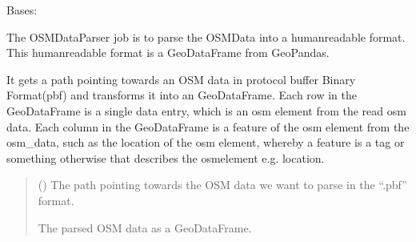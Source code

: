 \documentclass[letterpaper,10pt,english]{sphinxmanual}
\begin{document}
\begin{fulllineitems}
\label{\detokenize{apidoc/src.osm_configurator.model.parser:src.osm_configurator.model.parser.osm_data_parser_interface.OSMDataParserInterface}}
\pysigstartsignatures
{}
\pysigstopsignatures
\sphinxAtStartPar
Bases: 

\sphinxAtStartPar
The OSMDataParser job is to parse the OSMData into a human\sphinxhyphen{}readable format.
This human\sphinxhyphen{}readable format is a GeoDataFrame from GeoPandas.

\begin{fulllineitems}
\label{\detokenize{apidoc/src.osm_configurator.model.parser:src.osm_configurator.model.parser.osm_data_parser_interface.OSMDataParserInterface.parse_osm_data_file}}
\pysigstartsignatures
{}
\pysigstopsignatures
\sphinxAtStartPar
It gets a path pointing towards an OSM data in protocol buffer Binary Format(pbf) and transforms it into an
GeoDataFrame.
Each row in the GeoDataFrame is a single data entry, which is an osm element from the read osm data.
Each column in the GeoDataFrame is a feature of the osm element from the osm\_data, such as the location of the
osm element, whereby a feature is a tag or something otherwise that describes the osm\sphinxhyphen{}element e.g. location.
\begin{quote}\begin{description}
\sphinxAtStartPar
{} () \textendash{} The path pointing towards the OSM data we want to parse in the “.pbf” format.

\sphinxAtStartPar
The parsed OSM data as a GeoDataFrame.

\sphinxAtStartPar
{}

\end{description}\end{quote}

\end{fulllineitems}


\end{fulllineitems}
\end{document}

